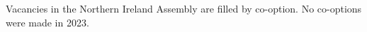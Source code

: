 \documentclass[a4paper,openany]{book}
\begin{document}
Vacancies in the Northern Ireland Assembly are filled by co-option.
No co-options were made in 2023.
%

%
%
\end{document}
